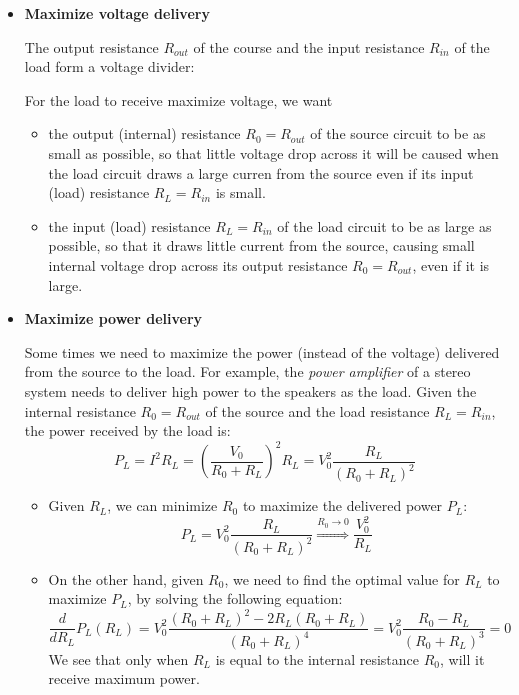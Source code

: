 \documentclass{article}
\begin{document}
\begin{itemize}
\item {\bf Maximize voltage delivery}

  The output resistance $R_{out}$ of the course and the input resistance
  $R_{in}$ of the load form a voltage divider:


  For the load to receive maximize voltage, we want 
  \begin{itemize}
  \item the output (internal) resistance $R_0=R_{out}$ of the source 
    circuit to be as small as possible, so that little voltage drop 
    across it will be caused when the load circuit draws a large curren 
    from the source even if its input (load) resistance $R_L=R_{in}$ is 
    small.

  \item the input (load) resistance $R_L=R_{in}$ of the load circuit to 
    be as large as possible, so that it draws little current from the 
    source, causing small internal voltage drop across its output 
    resistance $R_0=R_{out}$, even if it is large.
  \end{itemize}
  
\item {\bf Maximize power delivery}

  Some times we need to maximize the power (instead of the voltage)
  delivered from the source to the load. For example, the {\em power 
  amplifier} of a stereo system needs to deliver high power to the 
  speakers as the load. Given the internal resistance $R_0=R_{out}$ of 
  the source and the load resistance $R_L=R_{in}$, the power received 
  by the load is:
  \begin{equation}
    P_L=I^2 R_L=\left(\frac{V_0}{R_0+R_L}\right)^2 R_L	
    =V_0^2\frac{R_L}{(R_0+R_L)^2} 
  \end{equation}
  \begin{itemize}
  \item Given $R_L$, we can minimize $R_0$ to maximize the delivered
    power $P_L$:  
    \begin{equation}
      P_L=V_0^2\frac{R_L}{(R_0+R_L)^2}\stackrel{R_0\rightarrow 0}{\Longrightarrow}
      \frac{V_0^2}{R_L}
    \end{equation}
  \item On the other hand, given $R_0$, we need to find the optimal value 
    for $R_L$ to maximize $P_L$, by solving the following equation:
    \begin{equation}
      \frac{d}{dR_L} P_L(R_L)
      =V_0^2\frac{(R_0+R_L)^2-2R_L(R_0+R_L)}{(R_0+R_L)^4}	
      =V_0^2\frac{R_0-R_L}{(R_0+R_L)^3}=0
    \end{equation}
    We see that only when $R_L$ is equal to the internal resistance $R_0$,
    will it receive maximum power.
  \end{itemize}


\end{itemize}
\end{document}

